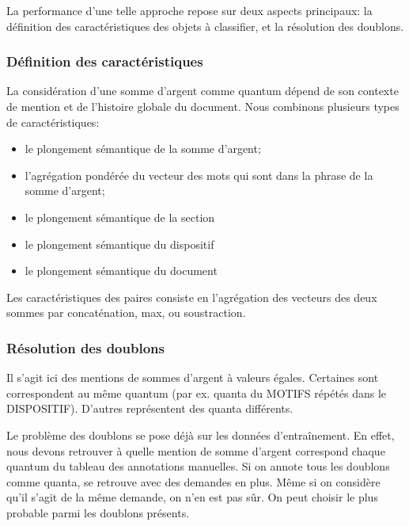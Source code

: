 La performance d'une telle approche repose sur deux aspects principaux: la définition des  caractéristiques des objets à classifier, et la résolution des doublons. 

\subsubsection{Définition des caractéristiques}

La considération d'une somme d'argent comme quantum dépend de son contexte de mention et de l'histoire globale du document. Nous combinons plusieurs types de caractéristiques:
\begin{itemize}
	\item le plongement sémantique de la somme d'argent;
	\item l'agrégation pondérée du vecteur des mots qui sont dans la phrase de la somme d'argent;
    \item le plongement sémantique de la section
    \item le plongement sémantique du dispositif
    \item le plongement sémantique du document
\end{itemize}

Les caractéristiques des paires consiste en l'agrégation des vecteurs des deux sommes par concaténation, max, ou soustraction.

\subsubsection{Résolution des doublons}
Il s'agit ici des mentions de sommes d'argent à valeurs égales. Certaines sont correspondent au même quantum (par ex. quanta du MOTIFS répétés dans le DISPOSITIF). D'autres représentent des quanta différents.

 Le problème des doublons se pose déjà sur les données d'entraînement. En effet, nous devons retrouver à quelle mention de somme d'argent correspond chaque quantum du tableau des annotations manuelles. Si on annote tous les doublons comme quanta, se retrouve avec des demandes en plus. Même si on considère qu'il s'agit de la même demande, on n'en est pas sûr. On peut choisir le plus probable parmi les doublons présents.


